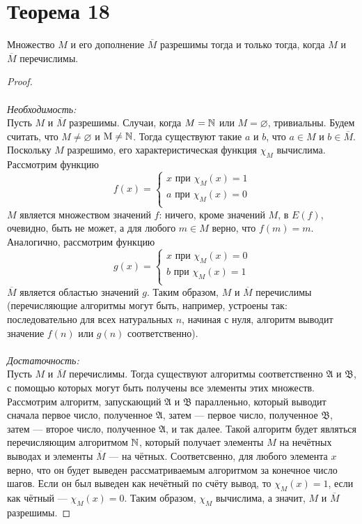\documentclass[a4paper,12pt]{article}
\begin{document}
    \section {Теорема 18}
    \begin{theorem}
    Множество $M$ и его дополнение $\overline{M}$ разрешимы тогда и только тогда, когда $M$ и $\overline{M}$ перечислимы.
    \end{theorem}
    \begin{proof}
    \strut\\\\\textit{Необходимость:}\smallskip\\
    Пусть $M$ и $\overline{M}$ разрешимы. Случаи, когда $M=\mathbb{N}$ или $M=\varnothing$, тривиальны. Будем считать, что $M\ne\varnothing$ и $\mathrm{M}\ne\mathbb{N}$. Тогда существуют такие $a$ и $b$, что $a\in M$ и $b\in\overline{M}$. Поскольку $M$ разрешимо, его характеристическая функция $\chi_M$ вычислима. Рассмотрим функцию 
    $$f(x) = 
    \begin{cases}
    x \text{ при } \chi_M(x) = 1 \\
    a \text{ при } \chi_M(x) = 0 \\
    \end{cases}
    $$
    $M$ является множеством значений $f$: ничего, кроме значений $M$, в $E(f)$, очевидно, быть не может, а для любого $m\in M$ верно, что $f(m)=m$. Аналогично, рассмотрим функцию
    $$g(x) = 
    \begin{cases}
    x \text{ при } \chi_M(x) = 0 \\
    b \text{ при } \chi_M(x) = 1 \\
    \end{cases}
    $$
    $\overline{M}$ является областью значений $g$. Таким образом, $M$ и $\overline{M}$ перечислимы (перечисляющие алгоритмы могут быть, например, устроены так: последовательно для всех натуральных $n$, начиная с нуля, алгоритм выводит значение $f(n)$ или $g(n)$ соответственно).\\\\
    \textit{Достаточность:}\smallskip\\
    Пусть $M$ и $\overline{M}$ перечислимы. Тогда существуют алгоритмы соответственно $\mathfrak{A}$ и $\mathfrak{B}$, с помощью которых могут быть получены все элементы этих множеств. Рассмотрим алгоритм, запускающий $\mathfrak{A}$ и $\mathfrak{B}$ паралленьно, который выводит сначала первое число, полученное $\mathfrak{A}$, затем --- первое число, полученное $\mathfrak{B}$, затем --- второе число, полученное $\mathfrak{A}$, и так далее. Такой алгоритм будет являться перечисляющим алгоритмом $\mathbb{N}$, который получает элементы $M$ на нечётных выводах и элементы $\overline{M}$ --- на чётных. Соответсвенно, для любого элемента $x$ верно, что он будет выведен рассматриваемым алгоритмом за конечное число шагов. Если он был выведен как нечётный по счёту вывод, то $\chi_M(x)=1$, если как чётный --- $\chi_M(x)=0$. Таким образом, $\chi_M$ вычислима, а значит, $M$ и $\overline{M}$ разрешимы.
    \end{proof}
    
\end{document}
